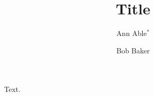\documentclass[sigconf]{acmart}
\begin{document}
\title{Title}
\author{Ann Able$^{*}$}
\author{Bob Baker}
\maketitle
Text.
\end{document}
